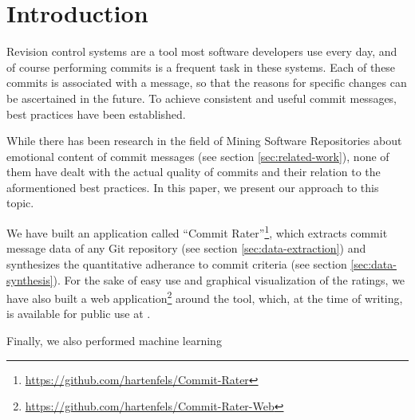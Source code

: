 \section{Introduction}
\label{sec:introduction}

%
%
%
%
%
%

Revision control systems are a tool most software developers use every day, and of course performing commits is a frequent task in these systems. Each of these commits is associated with a message, so that the reasons for specific changes can be ascertained in the future. To achieve consistent and useful commit messages, best practices have been established\cite{OffGuide,CB,TP,SR}.

While there has been research in the field of Mining Software Repositories about emotional content of commit messages (see section \ref{sec:related-work}), none of them have dealt with the actual quality of commits and their relation to the aformentioned best practices. In this paper, we present our approach to this topic.

We have built an application called ``Commit Rater''\footnote{\url{https://github.com/hartenfels/Commit-Rater}}, which extracts commit message data of any Git repository (see section \ref{sec:data-extraction}) and synthesizes the quantitative adherance to commit criteria (see section \ref{sec:data-synthesis}). For the sake of easy use and graphical visualization of the ratings, we have also built a web application\footnote{\url{https://github.com/hartenfels/Commit-Rater-Web}} around the tool, which, at the time of writing, is available for public use at .

Finally, we also performed machine learning 
